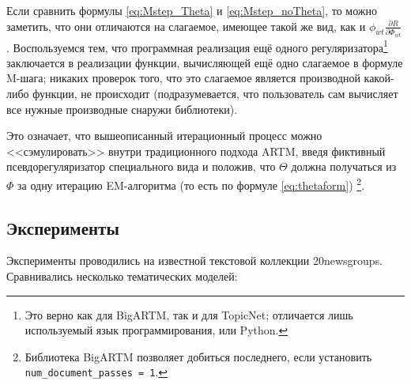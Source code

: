 Если сравнить формулы \ref{eq:Mstep_Theta} и \ref{eq:Mstep_noTheta}, то можно заметить, что они отличаются на слагаемое, имеющее такой же вид, как и $\phi_{wt} \frac{\partial{R}}{\partial{\Phi_{wt}}}$. Воспользуемся тем, что программная реализация ещё одного регуляризатора\footnote{Это верно как для BigARTM, так и для TopicNet; отличается лишь используемый язык программирования, \cpp или Python.}  заключается в реализации функции, вычисляющей ещё одно слагаемое в формуле M-шага; никаких проверок того, что это слагаемое является производной какой-либо функции, не происходит (подразумевается, что пользователь сам вычисляет все нужные производные снаружи библиотеки).

Это означает, что вышеописанный итерационный процесс можно <<сэмулировать>> внутри традиционного подхода ARTM, введя фиктивный псевдорегуляризатор специального вида и положив, что $\Theta$ должна получаться из $\Phi$ за одну итерацию EM-алгоритма (то есть по формуле \ref{eq:thetaform}) \footnote{Библиотека BigARTM позволяет добиться последнего, если установить \texttt{num\_document\_passes\ =\ 1}.}.


\subsection{Эксперименты}

Эксперименты проводились на известной текстовой коллекции 20newsgroups. Сравнивались несколько тематических моделей:


